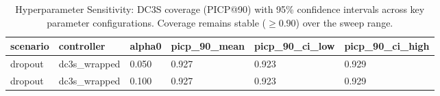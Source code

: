 \begin{table}[htbp]
\centering
\caption{Hyperparameter Sensitivity: DC3S coverage (PICP@90) with 95\% confidence intervals across key parameter configurations.  Coverage remains stable (${\geq}0.90$) over the sweep range.}
\label{tab:sensitivity_ci}
\begin{tabular}{llllll}
\toprule
scenario & controller & alpha0 & picp\_90\_mean & picp\_90\_ci\_low & picp\_90\_ci\_high \\
\midrule
dropout & dc3s\_wrapped & 0.050 & 0.927 & 0.923 & 0.929 \\
dropout & dc3s\_wrapped & 0.100 & 0.927 & 0.923 & 0.929 \\
\bottomrule
\end{tabular}
\end{table}